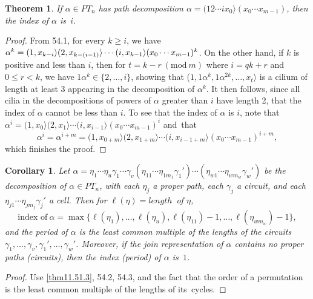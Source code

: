 \documentclass{surv-l}
\numberwithin{equation}{section}
\numberwithin{table}{section}
\numberwithin{figure}{section}
\newtheorem{theorem}[equation]{Theorem}
\newtheorem{corollary}[equation]{Corollary}
\theoremstyle{definition}
\begin{document}
\begin{theorem}\label{thm11.54.3}
If $\alpha\in PT_{n}$ has path decomposition $\alpha=(12\cdots
ix_{0}\rangle(x_{0}\cdots x_{m-1})$, then the index of $\alpha$
is~$i$.
\end{theorem}

\begin{proof} From 54.1, for every $k\geq i$, we have $\alpha^{k}=(1,
x_{k-i}\rangle(2,x_{k-(i-1)}\rangle\cdots\break (i,x_{k-1}\rangle
(x_{0}\cdots x_{m-1})^{k}$. On the other hand, if $k$ is positive
and less than $i$, then for $t= k-r\ (\mathrm{mod}\ m)$ where
$i=qk+r$ and $0\leq r<k$, we have $1\alpha^{k}\in\{2,\ldots, i\}$,
showing that ($1,1\alpha^{k}, 1\alpha^{2k},\ldots, x_{t}\rangle$
is a cilium of length at least 3 appearing in the decomposition of
$\alpha^{k}$. It then follows, since all cilia in the
decompositions of powers of $\alpha$ greater than $i$ have length
2, that the index of $\alpha$ cannot be less than $i$. To see that
the index of $\alpha$ is $i$, note that $\alpha^{i}=(1,
x_{0}\rangle(2, x_{1}\rangle\cdots(i, x_{i-1}\rangle(x_{0}\cdots
x_{m-1})^{i}$ and~that
\[
\alpha^{i}=\alpha^{i+m}=(1, x_{0+m}\rangle(2,x_{1+m}\rangle\cdots
(i, x_{i-1+m}\rangle (x_{0}\cdots x_{m-1})^{i+m},
\]
which finishes the proof.
\end{proof}

\setcounter{equation}{4}
\begin{corollary}\label{cor11.54.5}
Let
$\alpha=\eta_{1}\cdots\eta_{u}\gamma_{1}\cdots\gamma_{v}(\eta_{11}
\cdots\eta_{1m_{1}}\gamma_{1}')\cdots(\eta_{w1}\cdots\eta_{wm_{w}}\gamma_{w}')$
be the decomposition of $\alpha\in PT_{n}$, with each $\eta_{j}$ a
proper path, each $\gamma_{j}$ a circuit, and each
$\eta_{j1}\cdots\eta_{jm_{j}}\gamma_{j}'$ a cell. Then for
$\ell(\eta)= length$~of $\eta$,
\[
\text{index\ of}\ \alpha=\max\{\ell(\eta_{1}),\ldots,
\ell(\eta_{u}), \ell(\eta_{11})-1,\ldots, \ell(\eta_{wm_{w}})-1\},
\]
and the period of $\alpha$ is the least common multiple of the
lengths of the circuits $\gamma_{1},\ldots, \gamma_{v},
\gamma_{1}',\ldots, \gamma_{w}'$. Moreover, if the join
representation of $\alpha$ contains no proper paths (circuits),
then the index (period) of
$\alpha$ is~$1$.
\end{corollary}

\begin{proof} Use \ref{thm11.51.3}, 54.2, 54.3, and the fact that the order of a
permutation is the least common multiple of the lengths of
its~cycles.
\end{proof}
\end{document}
